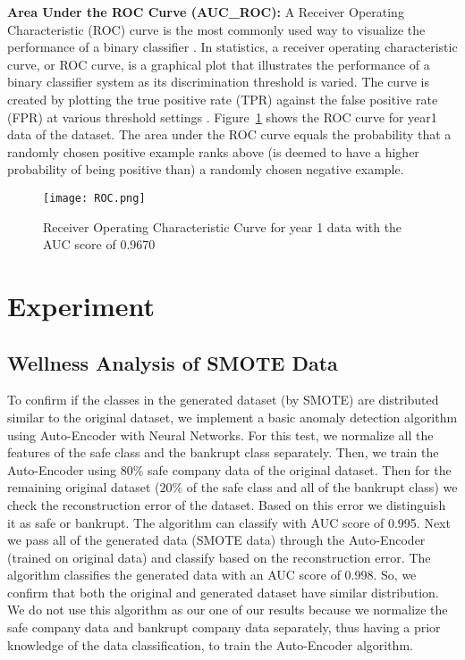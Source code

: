 
\textbf{Area Under the ROC Curve (AUC\_ROC):} A Receiver Operating Characteristic (ROC) curve is the most commonly used way to visualize the performance of a binary classifier \cite{dataSchool}. In statistics, a receiver operating characteristic curve, or ROC curve, is a graphical plot that illustrates the performance of a binary classifier system as its discrimination threshold is varied. The curve is created by plotting the true positive rate (TPR) against the false positive rate (FPR) at various threshold settings \cite{ROC}. Figure~\ref{fig:ROC} shows the ROC curve for year1 data of the dataset. The area under the ROC curve equals the probability that a randomly chosen positive example ranks above (is deemed to have a higher probability of being positive than) a randomly chosen negative example.

\begin{figure}[!htb]
\centering
\texttt{[image: ROC.png]}
\caption{Receiver Operating Characteristic Curve for year 1 data with the AUC score of 0.9670}
\label{fig:ROC}
\end{figure}

\section{Experiment}

\subsection{Wellness Analysis of SMOTE Data}
To confirm if the classes in the generated dataset (by SMOTE) are distributed similar to the original dataset, we implement a basic anomaly detection algorithm using Auto-Encoder with Neural Networks. For this test, we normalize all the features of the safe class and the bankrupt class separately. Then, we train the Auto-Encoder using $80\%$ safe company data of the original dataset. Then for the remaining original dataset ($20\%$ of the safe class and all of the bankrupt class) we check the reconstruction error of the dataset. Based on this error we distinguish it as safe or bankrupt. The algorithm can classify with AUC score of 0.995. Next we pass all of the generated data (SMOTE data) through the Auto-Encoder (trained on original data) and classify based on the reconstruction error. The algorithm classifies the generated data with an AUC score of 0.998. So, we confirm that both the original and generated dataset have similar distribution. We do not use this algorithm as our one of our results because we normalize the safe company data and bankrupt company data separately, thus having a prior knowledge of the data classification, to train the Auto-Encoder algorithm. 

